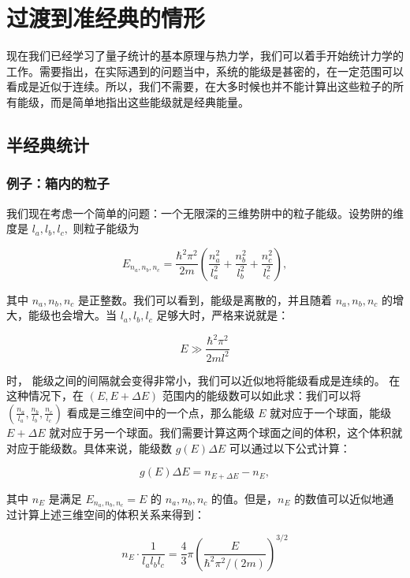 \chapter{过渡到准经典的情形}
现在我们已经学习了量子统计的基本原理与热力学，我们可以着手开始统计力学的工作。需要指出，在实际遇到的问题当中，系统的能级是甚密的，在一定范围可以看成是近似于连续。所以，我们不需要，在大多时候也并不能计算出这些粒子的所有能级，而是简单地指出这些能级就是经典能量。
\section{半经典统计}
\subsection{例子：箱内的粒子}
我们现在考虑一个简单的问题：一个无限深的三维势阱中的粒子能级。设势阱的维度是 $l_a, l_b, l_c,$ 则粒子能级为
\begin{linenomath}\begin{equation}
E_{n_a, n_b, n_c} = \frac{\hbar^2 \pi^2}{2m} \left( \frac{n_a^2}{l_a^2} + \frac{n_b^2}{l_b^2} + \frac{n_c^2}{l_c^2} \right),
\end{equation}\end{linenomath}
其中 $n_a, n_b, n_c$ 是正整数。我们可以看到，能级是离散的，并且随着 $n_a, n_b, n_c$ 的增大，能级也会增大。当 $l_a, l_b, l_c$ 足够大时，严格来说就是：
\begin{linenomath}\begin{equation}
E \gg \frac{\hbar^2 \pi^2}{2ml^2}
\end{equation}\end{linenomath}时，
能级之间的间隔就会变得非常小，我们可以近似地将能级看成是连续的。
在这种情况下，在 $(E, E+\Delta E)$ 范围内的能级数可以如此求：我们可以将 $\left( \frac{n_a}{l_a}, \frac{n_b}{l_b}, \frac{n_c}{l_c} \right)$ 看成是三维空间中的一个点，那么能级 $E$ 就对应于一个球面，能级 $E+\Delta E$ 就对应于另一个球面。我们需要计算这两个球面之间的体积，这个体积就对应于能级数。具体来说，能级数 $g(E) \Delta E$ 可以通过以下公式计算：
\begin{linenomath}\begin{equation}
g(E) \Delta E = n_{E+\Delta E} - n_E,
\end{equation}\end{linenomath}
其中 $n_E$ 是满足 $E_{n_a, n_b, n_c} = E$ 的 $n_a, n_b, n_c$ 的值。但是，$n_E$ 的数值可以近似地通过计算上述三维空间的体积关系来得到：
\begin{linenomath}\begin{equation}
n_E \cdot \frac{1}{l_al_bl_c} = \frac 43 \pi \left( \frac{E}{\hbar^2 \pi^2 / (2m)} \right)^{3/2}
\end{equation}\end{linenomath}
